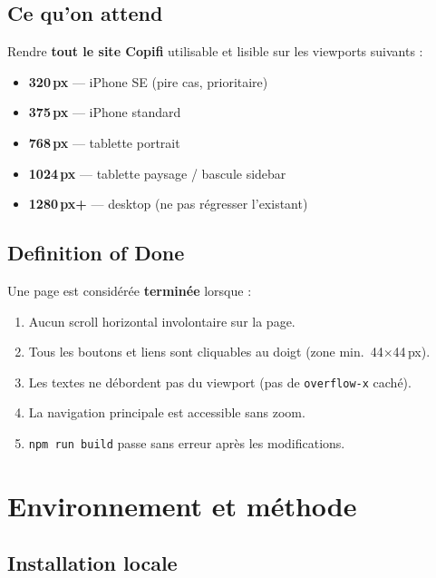 \documentclass[11pt,a4paper]{report}
\newcommand{\feat}[1]{\textbf{#1}}
\begin{document}
\section{Ce qu'on attend}

Rendre \textbf{tout le site Copifi} utilisable et lisible sur les viewports suivants :

\begin{itemize}[leftmargin=1.5em]
    \item \feat{320\,px} — iPhone SE (pire cas, prioritaire)
    \item \feat{375\,px} — iPhone standard
    \item \feat{768\,px} — tablette portrait
    \item \feat{1024\,px} — tablette paysage / bascule sidebar
    \item \feat{1280\,px+} — desktop (ne pas régresser l'existant)
\end{itemize}

\section{Definition of Done}

Une page est considérée \textbf{terminée} lorsque :

\begin{enumerate}[leftmargin=1.5em]
    \item Aucun scroll horizontal involontaire sur la page.
    \item Tous les boutons et liens sont cliquables au doigt (zone min.\ 44$\times$44\,px).
    \item Les textes ne débordent pas du viewport (pas de \texttt{overflow-x} caché).
    \item La navigation principale est accessible sans zoom.
    \item \texttt{npm run build} passe sans erreur après les modifications.
\end{enumerate}

\chapter{Environnement et méthode}

\section{Installation locale}
\end{document}

